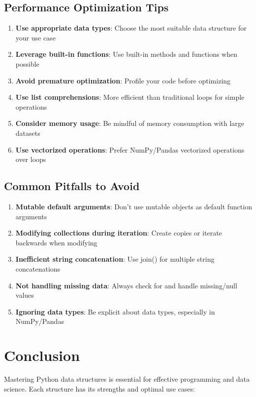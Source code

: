 \documentclass[12pt,a4paper]{book}
\begin{document}
\section{Performance Optimization Tips}

\begin{enumerate}
    \item \textbf{Use appropriate data types}: Choose the most suitable data structure for your use case
    \item \textbf{Leverage built-in functions}: Use built-in methods and functions when possible
    \item \textbf{Avoid premature optimization}: Profile your code before optimizing
    \item \textbf{Use list comprehensions}: More efficient than traditional loops for simple operations
    \item \textbf{Consider memory usage}: Be mindful of memory consumption with large datasets
    \item \textbf{Use vectorized operations}: Prefer NumPy/Pandas vectorized operations over loops
\end{enumerate}

\section{Common Pitfalls to Avoid}

\begin{enumerate}
    \item \textbf{Mutable default arguments}: Don't use mutable objects as default function arguments
    \item \textbf{Modifying collections during iteration}: Create copies or iterate backwards when modifying
    \item \textbf{Inefficient string concatenation}: Use join() for multiple string concatenations
    \item \textbf{Not handling missing data}: Always check for and handle missing/null values
    \item \textbf{Ignoring data types}: Be explicit about data types, especially in NumPy/Pandas
\end{enumerate}

\chapter{Conclusion}

Mastering Python data structures is essential for effective programming and data science. Each structure has its strengths and optimal use cases:
\end{document}
